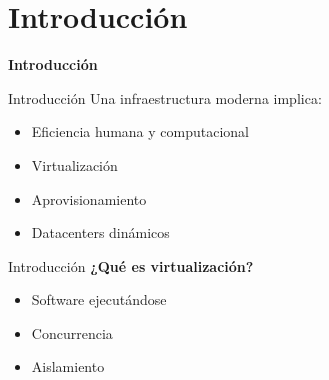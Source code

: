 \section{Introducción}

\begin{frame}
    \Huge
    \centering
    \textbf{Introducción}

\end{frame}


\begin{frame}{Introducción}
    \vspace{0cm}
    Una infraestructura moderna implica:
    \begin{itemize}
        \item Eficiencia humana y computacional
        \item Virtualización
        \item Aprovisionamiento
        \item Datacenters dinámicos
    \end{itemize}
\end{frame}

\begin{frame}{Introducción}
    \vspace{0cm}
    \textbf{¿Qué es virtualización?}
    \begin{itemize}
        \item Software ejecutándose
        \item Concurrencia
        \item Aislamiento
    \end{itemize}



\end{frame}

